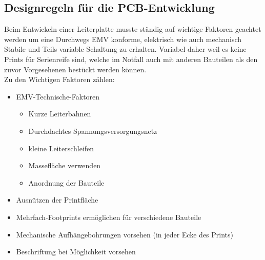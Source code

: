 \subsection{Designregeln für die PCB-Entwicklung}\label{subsec:3.1.2}
Beim Entwickeln einer Leiterplatte musste ständig auf wichtige Faktoren geachtet werden um eine Durchwegs EMV konforme, elektrisch wie auch mechanisch Stabile und Teils variable Schaltung zu erhalten.
Variabel daher weil es keine Prints für Serienreife sind, welche im Notfall auch mit anderen Bauteilen als den zuvor Vorgesehenen bestückt werden können.\\
Zu den Wichtigen Faktoren zählen:
\begin{itemize}
	\item EMV-Technische-Faktoren
	\begin{itemize}
		\item Kurze Leiterbahnen
		\item Durchdachtes Spannungsversorgungsnetz
		\item kleine Leiterschleifen
		\item Massefläche verwenden
		\item Anordnung der Bauteile
	\end{itemize}
	\item Ausnützen der Printfläche
	\item Mehrfach-Footprints ermöglichen für verschiedene Bauteile
	\item Mechanische Aufhängebohrungen vorsehen (in jeder Ecke des Prints)
	\item Beschriftung bei Möglichkeit vorsehen
\end{itemize}


